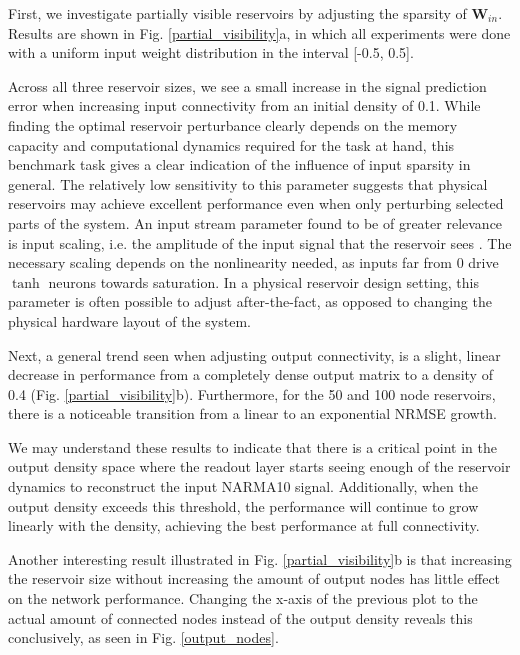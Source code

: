 First, we investigate partially visible reservoirs by adjusting the sparsity of
$\mathbf{W}_{in}$. Results are shown in Fig. \ref{partial_visibility}a, in which
all experiments were done with a uniform input weight distribution in the
interval [-0.5, 0.5].

Across all three reservoir sizes, we see a small increase in the signal
prediction error when increasing input connectivity from an initial density of
0.1. While finding the optimal reservoir perturbance clearly depends on the
memory capacity and computational dynamics required for the task at hand, this
benchmark task gives a clear indication of the influence of input sparsity in
general. The relatively low sensitivity to this parameter suggests that physical
reservoirs may achieve excellent performance even when only perturbing selected
parts of the system. An input stream parameter found to be of greater relevance
is input scaling, i.e. the amplitude of the input signal that the reservoir sees
\cite{alippi_quantification_2009}. The necessary scaling depends on the
nonlinearity needed, as inputs far from 0 drive $\tanh$ neurons towards
saturation. In a physical reservoir design setting, this parameter is often
possible to adjust after-the-fact, as opposed to changing the physical hardware
layout of the system.

Next, a general trend seen when adjusting output connectivity, is a slight,
linear decrease in performance from a completely dense output matrix to a
density of 0.4 (Fig. \ref{partial_visibility}b). Furthermore, for the 50 and 100
node reservoirs, there is a noticeable transition from a linear to an
exponential NRMSE growth.

We may understand these results to indicate that there is a critical point in
the output density space where the readout layer starts seeing enough of the
reservoir dynamics to reconstruct the input NARMA10 signal. Additionally, when
the output density exceeds this threshold, the performance will continue to grow
linearly with the density, achieving the best performance at full connectivity.

Another interesting result illustrated in Fig. \ref{partial_visibility}b is that
increasing the reservoir size without increasing the amount of output nodes has
little effect on the network performance. Changing the x-axis of the previous
plot to the actual amount of connected nodes instead of the output density
reveals this conclusively, as seen in Fig. \ref{output_nodes}.

